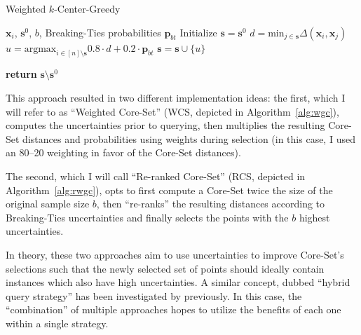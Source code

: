 \documentclass[english,bachelor,ul]{webisthesis} %
\begin{document}
\begin{algorithm}[htpb]
\caption{Weighted $k$-Center-Greedy}%
\label{alg:wgc}
\begin{algorithmic}

\Require $ \mathbf{x}_i $, $ \mathbf{s}^0 $, $ b $, Breaking-Ties probabilities $ \mathbf{p}_{bt} $
\State Initialize $ \mathbf{s} = \mathbf{s}^0 $
\Repeat
\State $ d = \text{min}_{j \in \mathbf{s}} \Delta(\mathbf{x}_i, \mathbf{x}_j) $ 
    \State $ u = \text{argmax}_{i \in [n] \setminus \mathbf{s}} 0.8 \cdot d + 0.2 \cdot \mathbf{p}_{bt} $
\State $ \mathbf{s} = \mathbf{s} \cup \{u\} $

\State \textbf{return} $\mathbf{s} \setminus \mathbf{s}^0 $
\end{algorithmic}
\end{algorithm}

This approach resulted in two different implementation ideas: the first, which I will refer to as ``Weighted Core-Set'' (WCS, depicted in Algorithm~\ref{alg:wgc}), computes the uncertainties prior to querying, then multiplies the resulting Core-Set distances and probabilities using weights during selection (in this case, I used an 80--20 weighting in favor of the Core-Set distances).

The second, which I will call ``Re-ranked Core-Set'' (RCS, depicted in Algorithm~\ref{alg:rwgc}), opts to first compute a Core-Set twice the size of the original sample size $b$, then ``re-ranks'' the resulting distances according to Breaking-Ties uncertainties and finally selects the points with the $b$ highest uncertainties.

In theory, these two approaches aim to use uncertainties to improve Core-Set's selections such that the newly selected set of points should ideally contain instances which also have high uncertainties. A similar concept, dubbed ``hybrid query strategy'' has been investigated by \cite{DBLP:journals/corr/abs-2110-03785} previously. In this case, the ``combination'' of multiple approaches hopes to utilize the benefits of each one within a single strategy.
\end{document}
